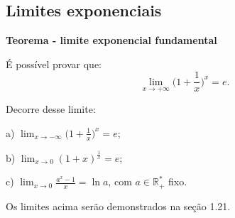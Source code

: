 \documentclass{article}
\begin{document}
{\begin{newpage}
\subsection{Limites exponenciais}
\begin{flushleft}
\textbf{Teorema - limite exponencial fundamental}
\end{flushleft}
\par É possível provar que:
$$\displaystyle{\lim_{x\to +\infty }} \Big(1 + \frac{1}{x}\Big)^x = e.$$
\vspace{0.3cm}
\par Decorre desse limite:
\par
\vspace{0.3cm}
a) $\displaystyle{\lim_{x\to -\infty }} \Big(1 + \frac{1}{x}\Big)^x = e$;
\par
\vspace{0.3cm}
b) $\displaystyle{\lim_{x\to 0}} (1+x)^{\frac{1}{x}} = e$;
\par
\vspace{0.3cm}
c) $\displaystyle{\lim_{x\to 0}} \frac{a^{x} - 1}{x} = \ln{a}$, com $a\in\mathbb{R^{*}_+}$ fixo.
\vspace{0.3cm}
\par Os limites acima serão demonstrados na seção 1.21.
\par
\vspace{0.3cm}

\end{newpage}}
\end{document}
